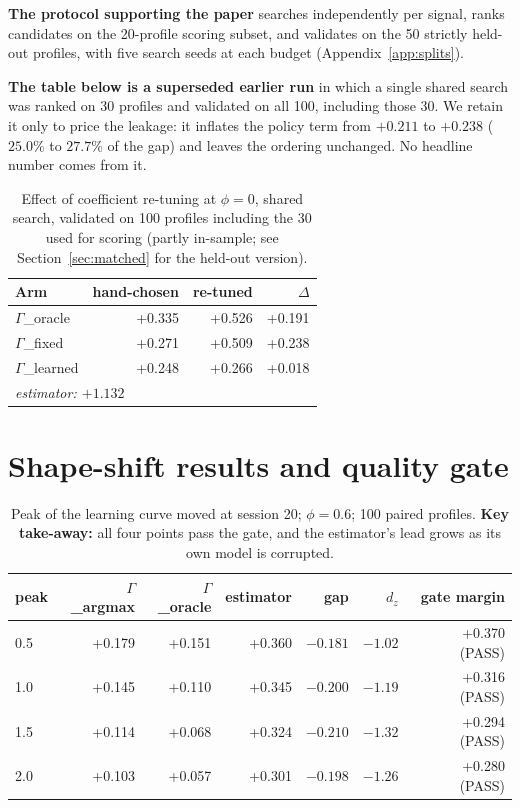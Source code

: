 \documentclass{article}
\begin{document}
\textbf{The protocol supporting the paper} searches independently per signal, ranks candidates on the 20-profile scoring subset, and validates on the 50 strictly held-out profiles, with five search seeds at each budget (Appendix~\ref{app:splits}).

\textbf{The table below is a superseded earlier run} in which a single shared search was ranked on 30 profiles and validated on all 100, including those 30. We retain it only to price the leakage: it inflates the policy term from $+0.211$ to $+0.238$ ($25.0\%$ to $27.7\%$ of the gap) and leaves the ordering unchanged. No headline number comes from it.
\begin{table}[H]
  \caption{Effect of coefficient re-tuning at $\phi{=}0$, shared search, validated on 100 profiles including the 30 used for scoring (partly in-sample; see Section~\ref{sec:matched} for the held-out version).}
  \centering\small
  \begin{tabular}{lrrr}
    \toprule
    Arm & hand-chosen & re-tuned & $\Delta$ \\
    \midrule
    $\Gamma$\_oracle & +0.335 & +0.526 & +0.191 \\
    $\Gamma$\_fixed & +0.271 & +0.509 & +0.238 \\
    $\Gamma$\_learned & +0.248 & +0.266 & +0.018 \\
    \midrule
    \multicolumn{4}{l}{\emph{estimator: $+1.132$}} \\
    \bottomrule
  \end{tabular}
\end{table}

\section{Shape-shift results and quality gate}
\label{app:shapegate}
\begin{table}[H]
  \caption{Peak of the learning curve moved at session 20; $\phi{=}0.6$; 100 paired profiles. \textbf{Key take-away:} all four points pass the gate, and the estimator's lead grows as its own model is corrupted.}
  \centering\small
  \begin{tabular}{lrrrrrr}
    \toprule
    peak & $\Gamma$\_argmax & $\Gamma$\_oracle & estimator & gap & $d_z$ & gate margin \\
    \midrule
    0.5 & +0.179 & +0.151 & +0.360 & $-0.181$ & $-1.02$ & +0.370 (PASS) \\
    1.0 & +0.145 & +0.110 & +0.345 & $-0.200$ & $-1.19$ & +0.316 (PASS) \\
    1.5 & +0.114 & +0.068 & +0.324 & $-0.210$ & $-1.32$ & +0.294 (PASS) \\
    2.0 & +0.103 & +0.057 & +0.301 & $-0.198$ & $-1.26$ & +0.280 (PASS) \\
    \bottomrule
  \end{tabular}
\end{table}
\end{document}

